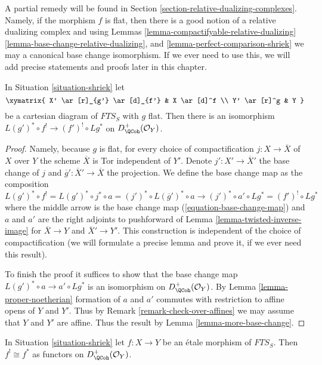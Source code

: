 \medskip\noindent
A partial remedy will be found in
Section \ref{section-relative-dualizing-complexes}.
Namely, if the morphism $f$ is flat, then there is a good
notion of a relative dualizing complex and using
Lemmas \ref{lemma-compactifyable-relative-dualizing}
\ref{lemma-base-change-relative-dualizing},
and \ref{lemma-perfect-comparison-shriek}
we may a canonical base change isomorphism.
If we ever need to use this, we will add precise statements and
proofs later in this chapter.

\begin{lemma}
\label{lemma-base-change-shriek-flat}
In Situation \ref{situation-shriek} let
$$
\xymatrix{
X' \ar[r]_{g'} \ar[d]_{f'} & X \ar[d]^f \\
Y' \ar[r]^g & Y
}
$$
be a cartesian diagram of $\textit{FTS}_S$ with $g$ flat.
Then there is an isomorphism
$L(g')^* \circ f^! \to (f')^! \circ Lg^*$ on
$D_\QCoh^+(\mathcal{O}_Y)$.
\end{lemma}

\begin{proof}
Namely, because $g$ is flat, for every choice of
compactification $j : X \to \overline{X}$ of $X$ over $Y$
the scheme $\overline{X}$ is Tor independent of $Y'$.
Denote $j' : X' \to \overline{X}'$ the
base change of $j$ and $\overline{g}' : \overline{X}' \to \overline{X}$
the projection. We define the base change map as the composition
$$
L(g')^* \circ f^! = L(g')^* \circ j^* \circ a =
(j')^* \circ L(\overline{g}')^* \circ a \longrightarrow
(j')^* \circ a' \circ Lg^* = (f')^! \circ Lg^*
$$
where the middle arrow is the base change map
(\ref{equation-base-change-map})
and $a$ and $a'$ are the right adjoints to pushforward
of Lemma \ref{lemma-twisted-inverse-image}
for $\overline{X} \to Y$ and $\overline{X}' \to Y'$.
This construction is independent of the choice of
compactification (we will formulate a precise lemma
and prove it, if we ever need this result).

\medskip\noindent
To finish the proof it suffices to show that the base change
map $L(g')^* \circ a \to a' \circ Lg^*$ is an isomorphism
on $D_\QCoh^+(\mathcal{O}_Y)$.
By Lemma \ref{lemma-proper-noetherian} formation of $a$ and $a'$
commutes with restriction to affine opens of $Y$ and $Y'$.
Thus by Remark \ref{remark-check-over-affines}
we may assume that $Y$ and $Y'$ are affine.
Thus the result by Lemma \ref{lemma-more-base-change}.
\end{proof}

\begin{lemma}
\label{lemma-shriek-etale}
In Situation \ref{situation-shriek} let $f : X \to Y$ be an \'etale
morphism of $\textit{FTS}_S$. Then $f^! \cong f^*$ as functors on
$D^+_\QCoh(\mathcal{O}_Y)$.
\end{lemma}

